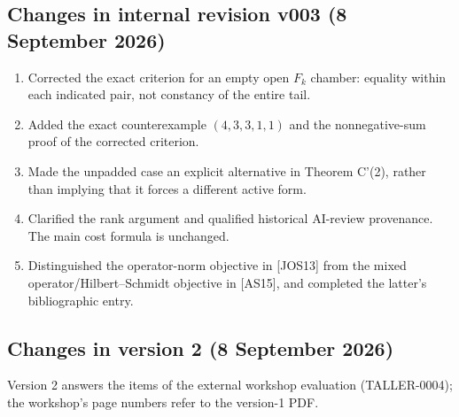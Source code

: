 \documentclass[
  11pt,
  a4paper,
]{article}
\providecommand{\tightlist}{%
  \setlength{\itemsep}{0pt}\setlength{\parskip}{0pt}}
\begin{document}
\subsection{Changes in internal revision v003 (8 September
2026)}\label{changes-in-internal-revision-v003-8-september-2026}

\begin{enumerate}
\def\labelenumi{\arabic{enumi}.}
\tightlist
\item
  Corrected the exact criterion for an empty open \(F_k\) chamber:
  equality within each indicated pair, not constancy of the entire tail.
\item
  Added the exact counterexample \((4,\allowbreak{}3,\allowbreak{}3,\allowbreak{}1,\allowbreak{}1)\) and the nonnegative-sum
  proof of the corrected criterion.
\item
  Made the unpadded case an explicit alternative in Theorem C'(2),
  rather than implying that it forces a different active form.
\item
  Clarified the rank argument and qualified historical AI-review
  provenance. The main cost formula is unchanged.
\item
  Distinguished the operator-norm objective in {[}JOS13{]} from the
  mixed operator/Hilbert--Schmidt objective in {[}AS15{]}, and completed
  the latter's bibliographic entry.
\end{enumerate}

\subsection{Changes in version 2 (8 September
2026)}\label{changes-in-version-2-8-september-2026}

Version 2 answers the items of the external workshop evaluation
(TALLER-0004); the workshop's page numbers refer to the version-1 PDF.
\end{document}
